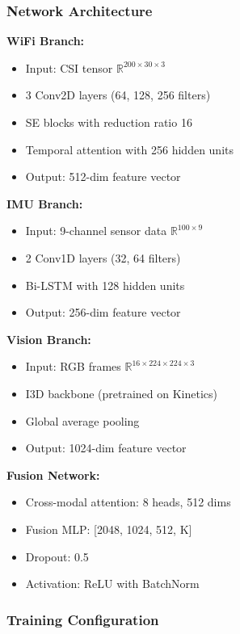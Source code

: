 \documentclass[journal]{IEEEtran}
\begin{document}
\subsubsection{Network Architecture}

\textbf{WiFi Branch:}
\begin{itemize}
\item Input: CSI tensor $\mathbb{R}^{200 \times 30 \times 3}$
\item 3 Conv2D layers (64, 128, 256 filters)
\item SE blocks with reduction ratio 16
\item Temporal attention with 256 hidden units
\item Output: 512-dim feature vector
\end{itemize}

\textbf{IMU Branch:}
\begin{itemize}
\item Input: 9-channel sensor data $\mathbb{R}^{100 \times 9}$
\item 2 Conv1D layers (32, 64 filters)
\item Bi-LSTM with 128 hidden units
\item Output: 256-dim feature vector
\end{itemize}

\textbf{Vision Branch:}
\begin{itemize}
\item Input: RGB frames $\mathbb{R}^{16 \times 224 \times 224 \times 3}$
\item I3D backbone (pretrained on Kinetics)
\item Global average pooling
\item Output: 1024-dim feature vector
\end{itemize}

\textbf{Fusion Network:}
\begin{itemize}
\item Cross-modal attention: 8 heads, 512 dims
\item Fusion MLP: [2048, 1024, 512, K]
\item Dropout: 0.5
\item Activation: ReLU with BatchNorm
\end{itemize}

\subsubsection{Training Configuration}
\end{document}
